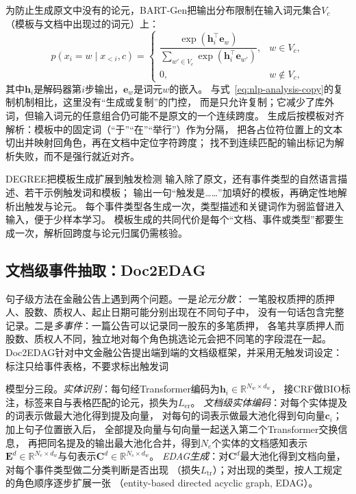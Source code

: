为防止生成原文中没有的论元，BART-Gen把输出分布限制在输入词元集合$V_c$
（模板与文档中出现过的词元）上：
\begin{equation}
  p(x_i=w\mid x_{<i},c)=
  \begin{cases}
    \dfrac{\exp(\bm{h}_i^{\top}\bm{e}_w)}{\sum_{w'\in V_c}\exp(\bm{h}_i^{\top}\bm{e}_{w'})}, & w\in V_c,\\[2ex]
    0, & w\notin V_c,
  \end{cases}
  \label{eq:nlp-extraction-bartgen-copy}
\end{equation}
其中$\bm{h}_i$是解码器第$i$步输出，$\bm{e}_w$是词元$w$的嵌入。
与式~\eqref{eq:nlp-analysis-copy}的复制机制相比，这里没有“生成或复制”的门控，
而是只允许复制；它减少了库外词，但输入词元的任意组合仍可能不是原文的一个连续跨度。
生成后按模板对齐解析：模板中的固定词（“于”“在”“举行”）作为分隔，
把各占位符位置上的文本切出并映射回角色，再在文档中定位字符跨度；
找不到连续匹配的输出标记为解析失败，而不是强行就近对齐。

DEGREE把模板生成扩展到触发检测
输入除了原文，还有事件类型的自然语言描述、若干示例触发词和模板；
输出一句“触发是……”加填好的模板，再确定性地解析出触发与论元。
每个事件类型各生成一次，类型描述和关键词作为弱监督进入输入，便于少样本学习。
模板生成的共同代价是每个“文档、事件或类型”都要生成一次，解析回跨度与论元归属仍需核验。

\subsection{文档级事件抽取：Doc2EDAG}
\label{sec:nlp-extraction-doc2edag}

句子级方法在金融公告上遇到两个问题。一是\emph{论元分散}：
一笔股权质押的质押人、股数、质权人、起止日期可能分别出现在不同句子中，
没有一句话包含完整记录。二是\emph{多事件}：一篇公告可以记录同一股东的多笔质押，
各笔共享质押人而股数、质权人不同，独立地对每个角色挑选论元会把不同笔的字段混在一起。
Doc2EDAG针对中文金融公告提出端到端的文档级框架，并采用无触发词设定：
标注只给事件表格，不要求标出触发词

模型分三段。\emph{实体识别}：每句经Transformer编码为$\bm{h}_i\in\mathbb{R}^{N_w\times d_w}$，
接CRF做BIO标注，标签来自与表格匹配的论元，损失为$L_{\mathrm{er}}$。
\emph{文档级实体编码}：对每个实体提及的词表示做最大池化得到提及向量，
对每句的词表示做最大池化得到句向量$\bm{c}_i$；加上句子位置嵌入后，
全部提及向量与句向量一起送入第二个Transformer交换信息，
再把同名提及的输出最大池化合并，得到$N_e$个实体的文档感知表示
$\bm{E}^{d}\in\mathbb{R}^{N_e\times d_w}$与句表示$\bm{C}^{d}\in\mathbb{R}^{N_s\times d_w}$。
\emph{EDAG生成}：对$\bm{C}^{d}$最大池化得到文档向量，对每个事件类型做二分类判断是否出现
（损失$L_{\mathrm{tr}}$）；对出现的类型，按人工规定的角色顺序逐步扩展一张
（entity-based directed acyclic graph, EDAG）。

